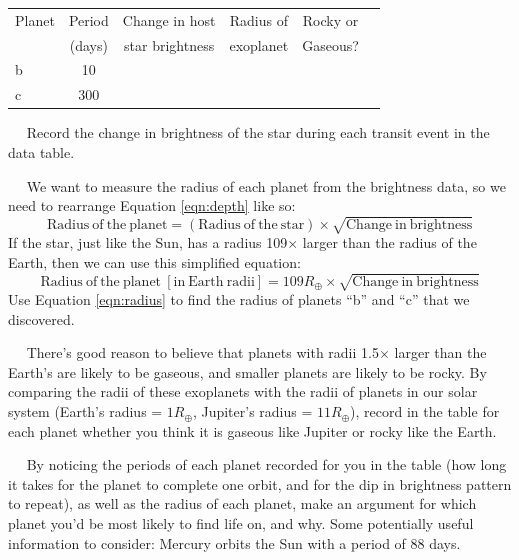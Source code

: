 \documentclass[12pt]{article}
\newcommand{\question}[1]{\vspace{10mm} \noindent {\bf #1)}~~}
\begin{document}
\begin{table}[h!]
\centering
\begin{tabular}{|l |c |c| c| c| c|}
\hline
Planet & Period & Change in host & Radius of & Rocky or  \\
 & (days) & star brightness  &  exoplanet  &  Gaseous? \\ \hline
b & 10 & \rule{0pt}{1.5cm} \hspace{4cm} & \hspace{4cm} & \hspace{4cm}\\ \hline
c & 300 & \rule{0pt}{1.5cm} & &\\ \hline
\end{tabular}
\end{table}

\pagebreak

\question{1} Record the change in brightness of the star during each transit event in the data table. 

\question{2} We want to measure the radius of each planet from the brightness data, so we need to rearrange Equation \ref{eqn:depth} like so:
\begin{equation}
\mathrm{Radius~of~the~planet} = \left( \mathrm{Radius~of~the~star} \right) \times \sqrt{\mathrm{Change~in~brightness}}
\end{equation}
If the star, just like the Sun, has a radius 109$\times$ larger than the radius of the Earth, then we can use this simplified equation:
\begin{equation}
\mathrm{Radius~of~the~planet~[in~Earth~radii]} = 109R_\oplus  \times \sqrt{\mathrm{Change~in~brightness}} \label{eqn:radius}
\end{equation}
Use Equation \ref{eqn:radius} to find the radius of planets ``b'' and ``c'' that we discovered. 

\question{3} There's good reason to believe that planets with radii 1.5$\times$ larger than the Earth's are likely to be gaseous, and smaller planets are likely to be rocky. By comparing the radii of these exoplanets with the radii of planets in our solar system (Earth's radius = $1 R_\oplus$, Jupiter's radius = $11 R_\oplus$), record in the table for each planet whether you think it is gaseous like Jupiter or rocky like the Earth.


\question{4} By noticing the periods of each planet recorded for you in the table (how long it takes for the planet to complete one orbit, and for the dip in brightness pattern to repeat), as well as the radius of each planet, make an argument for which planet you'd be most likely to find life on, and why. Some potentially useful information to consider: Mercury orbits the Sun with a period of 88 days.
\vspace{6 cm}
\end{document}
